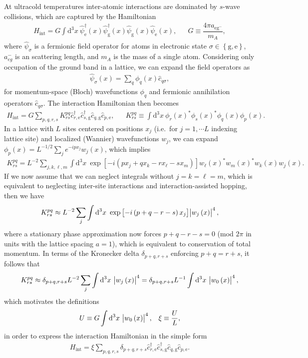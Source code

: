 \documentclass[aps,notitlepage,nofootinbib,11pt]{revtex4-1}
\renewcommand{\t}{\text} %
\newcommand{\f}[2]{\dfrac{#1}{#2}} %
\newcommand{\p}[1]{\left(#1\right)} %
\renewcommand{\sp}[1]{\left[#1\right]} %
\renewcommand{\set}[1]{\left\{#1\right\}} %
\renewcommand{\d}{\text{d}} %
\newcommand{\g}{\text{g}} %
\newcommand{\e}{\text{e}}
\newcommand{\1}{\hat{\mathds{1}}}
\begin{document}
At ultracold temperatures inter-atomic interactions are dominated by
$s$-wave collisions, which are captured by the Hamiltonian
\begin{align}
  H_{\t{int}} = G \int \d^3x~
  \hat\psi_\e^\dag\p{x} \hat\psi_\g^\dag\p{x}
  \hat\psi_\g\p{x} \hat\psi_\e\p{x},
  &&
  G \equiv \f{4\pi a_{\e\g^-}}{m_A},
\end{align}
where $\hat\psi_\sigma$ is a fermionic field operator for atoms in
electronic state $\sigma\in\set{\g,\e}$, $a_{eg}^-$ is an scattering
length, and $m_A$ is the mass of a single atom.  Considering only
occupation of the ground band in a lattice, we can expand the field
operators as
\begin{align}
  \hat\psi_\sigma\p{x} = \sum_q \phi_q\p{x} \hat c_{q\sigma},
\end{align}
for momentum-space (Bloch) wavefunctions $\phi_q$ and fermionic
annihilation operators $\hat c_{q\sigma}$.  The interaction
Hamiltonian then becomes
\begin{align}
  H_{\t{int}} = G \sum_{p,q,r,s} K^{pq}_{rs}
  \hat c_{r,\e}^\dag \hat c_{s,\g}^\dag \hat c_{q,\g} \hat c_{p,\e},
  &&
  K^{pq}_{rs} \equiv \int \d^3x~
  \phi_r\p{x}^* \phi_s\p{x}^* \phi_q\p{x} \phi_p\p{x}.
\end{align}
In a lattice with $L$ sites centered on positions $x_j$ (i.e.~for
$j=1,\cdots L$ indexing lattice site) and localized (Wannier)
wavefunctions $w_j$, we can expand
$\phi_p\p{x}=L^{-1/2}\sum_je^{-ipx_j}w_j\p{x}$, which implies
\begin{align}
  K^{pq}_{rs} = L^{-2} \sum_{j,k,\ell,m} \int \d^3x~
  \exp\sp{-i\p{px_j+qx_k-rx_\ell-sx_m}}
  w_\ell\p{x}^* w_m\p{x}^* w_k\p{x} w_j\p{x}.
\end{align}
If we now assume that we can neglect integrals without $j=k=\ell=m$,
which is equivalent to neglecting inter-site interactions and
interaction-assisted hopping, then we have
\begin{align}
  K^{pq}_{rs} \approx L^{-2} \sum_j \int \d^3x~
  \exp\sp{-i\p{p+q-r-s}x_j} \abs{w_j\p{x}}^4,
\end{align}
where a stationary phase approximation now forces $p+q-r-s=0$ (mod
$2\pi$ in units with the lattice spacing $a=1$), which is equivalent
to conservation of total momentum.  In terms of the Kronecker delta
$\delta_{p+q,r+s}$ enforcing $p+q=r+s$, it follows that
\begin{align}
  K^{pq}_{rs} \approx \delta_{p+q,r+s} L^{-2}
  \sum_j \int \d^3x~ \abs{w_j\p{x}}^4
  = \delta_{p+q,r+s} L^{-1} \int \d^3x~ \abs{w_0\p{x}}^4,
\end{align}
which motivates the definitions
\begin{align}
  U \equiv G \int \d^3x~ \abs{w_0\p{x}}^4,
  &&
  \xi \equiv \f{U}{L},
\end{align}
in order to express the interaction Hamiltonian in the simple form
\begin{align}
  H_{\t{int}} = \xi \sum_{p,q,r,s}
  \delta_{p+q,r+s} \hat c_{r,\e}^\dag \hat c_{s,\g}^\dag
  \hat c_{q,\g} \hat c_{p,\e}.
  \label{eq:H_int_full}
\end{align}
\end{document}
